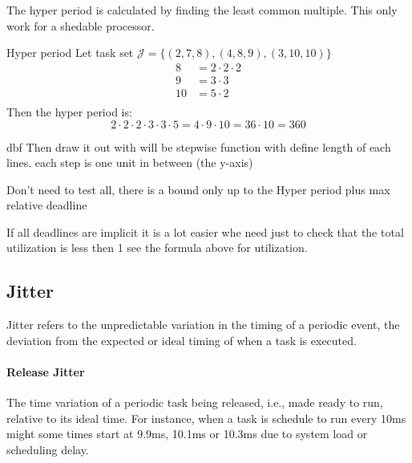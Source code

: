 The hyper period is calculated by finding the least common multiple. 
This only work for a shedable processor.
\begin{exampleblock}{Hyper period}
  Let task set $\mathcal{J}= \{(2,7,8),(4,8,9),(3,10,10)\}$
  \begin{align*}
    8 &= 2\cdot2\cdot2 \\
    9 &= 3\cdot3 \\ 
    10 &= 5\cdot2 \\
  \end{align*}
  Then the hyper period is:
  \begin{equation*}
    2\cdot2\cdot2\cdot3\cdot3\cdot5 = 4\cdot9\cdot10 = 36\cdot10 = 360  
  \end{equation*}
\end{exampleblock}

\begin{exampleblock}{dbf}
  Then draw it out with will be stepwise function with define length of each lines. each step is one unit in between (the y-axis)

  Don't need to test all, there is a bound only up to the Hyper period plus max relative deadline
\end{exampleblock}

If all deadlines are implicit it is a lot easier whe need just to check that the total utilization is less then 1 see the formula above for utilization.



\subsection{Jitter}

Jitter refers to the unpredictable variation in the timing of a periodic event, the deviation from the expected or ideal timing of when a task is executed.

\paragraph{Release Jitter} The time variation of a periodic task being released, i.e., made ready to run, relative to its ideal time. For instance, when a task is schedule to run every 10ms might some times start at 9.9ms, 10.1ms or 10.3ms due to system load or scheduling delay.

